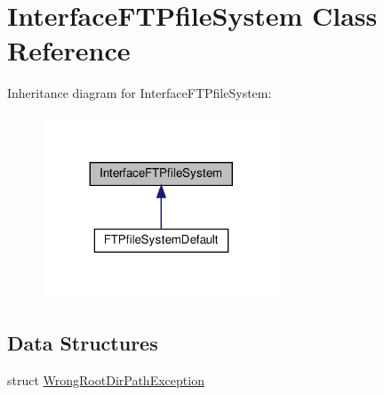 \hypertarget{classInterfaceFTPfileSystem}{}\section{Interface\+F\+T\+Pfile\+System Class Reference}
\label{classInterfaceFTPfileSystem}


Inheritance diagram for Interface\+F\+T\+Pfile\+System\+:\nopagebreak
\begin{figure}[H]
\begin{center}
\leavevmode
\includegraphics[width=200pt]{d1/d0b/classInterfaceFTPfileSystem__inherit__graph}
\end{center}
\end{figure}
\subsection*{Data Structures}
\begin{DoxyCompactItemize}
\item 
struct \hyperlink{structInterfaceFTPfileSystem_1_1WrongRootDirPathException}{Wrong\+Root\+Dir\+Path\+Exception}
\end{DoxyCompactItemize}
